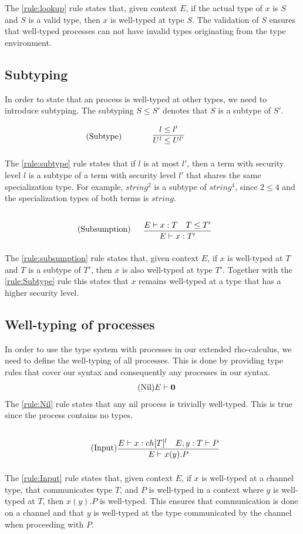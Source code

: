 The \ref{rule:lookup} rule states that, given context $E$, if the actual type of $x$ is $S$ and $S$ is a valid type, then $x$ is well-typed at type $S$.
The validation of $S$ ensures that well-typed processes can not have invalid types originating from the type environment.

\subsection{Subtyping}
In order to state that an process is well-typed at other types, we need to introduce subtyping.
The subtyping $S\leq S'$ denotes that $S$ is a subtype of $S'$. 

\begin{align*}
    \tag{Subtype}\label{rule:subtype} &\infrule{l\leq l'}{U^l\leq U^{l'}}
\end{align*}

The \ref{rule:subtype} rule states that if $l$ is at most $l'$, then a term with security level $l$ is a subtype of a term with security level $l'$ that shares the same specialization type.
For example, $string^2$ is a subtype of $string^4$, since $2\leq4$ and the specialization types of both terms is $string$.

\begin{align*}
    \tag{Subsumption}\label{rule:subsumption} &\infrule{E\vdash x:T\quad T\leq T'}{E\vdash x:T'}
\end{align*}
The \ref{rule:subsumption} rule states that, given context $E$, if $x$ is well-typed at $T$ and $T$ is a subtype of $T'$, then $x$ is also well-typed at type $T'$.
Together with the \ref{rule:Subtype} rule this states that $x$ remains well-typed at a type that has a higher security level.

\subsection{Well-typing of processes}
In order to use the type system with processes in our extended rho-calculus, we need to define the well-typing of all processes.
This is done by providing type rules that cover our syntax and consequently any processes in our syntax.
\begin{align*}
    \tag{Nil}\label{rule:Nil} &E \vdash \mathbf{0}
\end{align*}
The \ref{rule:Nil} rule states that any nil process is trivially well-typed.
This is true since the process contains no types.

\begin{align*}
    \tag{Input}\label{rule:Input} &\infrule{E\vdash x:ch[T]^l\quad E,y:T\vdash P}{E \vdash \inp{x}{y}P}
\end{align*}
The \ref{rule:Input} rule states that, given context $E$, if $x$ is well-typed at a channel type, that communicates type $T$, and $P$ is well-typed in a context where $y$ is well-typed at $T$, then $x(y).P$ is well-typed.
This ensures that communication is done on a channel and that $y$ is well-typed at the type communicated by the channel when proceeding with $P$.

